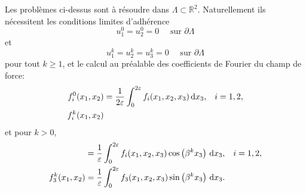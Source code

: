 Les problèmes ci-dessus sont à résoudre dans $\Lambda \subset
\mathbb R^2$. Naturellement ils nécessitent les conditions limites
d'adhérence
\begin{equation*}
u_1^0 = u_2^0 = 0 \quad\text{ sur }\partial \Lambda
\end{equation*}
et
\begin{equation*}
 u_1^k = u_2^k = u_3^k = 0 \quad\text{ sur }\partial \Lambda
\end{equation*}
pour tout $k \geq 1$, et le calcul au préalable des coefficients
de Fourier du champ de force:
\begin{align}
  f_i^0(x_1, x_2) %
  &= \frac{1}{2\thickness}\int_0^{2\thickness}f_i(x_1, x_2, x_3)%
  \,\mathrm dx_3,& i = 1,2,\label{eq:force-coefficient-1}\\
  f_i^k(x_1, x_2)
\end{align}
et pour $k > 0$,
\begin{align}
  &= \frac{1}{\thickness}\int_0^{2\thickness}f_i(x_1, x_2, x_3)%
  \cos\parent{\beta^kx_3}\,\mathrm dx_3,& i = 1,2,\label{eq:force-coefficient-2}\\
  f_3^k(x_1, x_2)%
  &= \frac{1}{\thickness}\int_0^{2\thickness}f_3(x_1, x_2, x_3)%
  \sin\parent{\beta^kx_3}\,\mathrm dx_3.\label{eq:force-coefficient-3}
\end{align}

